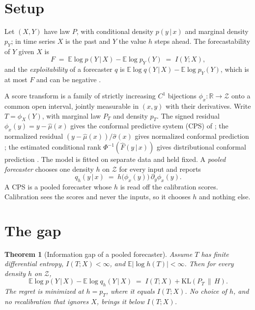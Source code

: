 \documentclass[11pt]{article}
\newtheorem{theorem}{Theorem}
\theoremstyle{definition}
\newcommand{\R}{\mathbb{R}}
\newcommand{\E}{\mathbb{E}}
\newcommand{\KL}{\mathrm{KL}}
\newcommand{\given}{\,\vert\,}
\begin{document}
\section{Setup}\label{sec:setup}

Let $(X,Y)$ have law $P$, with conditional density $p(y\given x)$ and marginal density
$p_Y$; in time series $X$ is the past and $Y$ the value $h$ steps ahead. The forecastability
of $Y$ given $X$ is
\begin{equation}\label{eq:F}
  F \;=\; \E\log p(Y\given X)-\E\log p_Y(Y)\;=\;I(Y;X),
\end{equation}
and the \emph{exploitability} of a forecaster $q$ is $\E\log q(Y\given X)-\E\log p_Y(Y)$,
which is at most $F$ and can be negative \citep{catt2026}.

A score transform is a family of strictly increasing $C^1$ bijections $\phi_x:\R\to\mathcal
Z$ onto a common open interval, jointly measurable in $(x,y)$ with their derivatives. Write
$T=\phi_X(Y)$, with marginal law $P_T$ and density $p_T$. The signed residual
$\phi_x(y)=y-\hat\mu(x)$ gives the conformal predictive system (CPS) of
\citet{vovk2019nonparametric}; the normalized residual $(y-\hat\mu(x))/\hat\sigma(x)$ gives
normalized conformal prediction \citep{lei2018distribution}; the estimated conditional rank
$\Phi^{-1}(\hat F(y\given x))$ gives distributional conformal prediction
\citep{chernozhukov2021distributional}. The model is fitted on separate data and held
fixed. A \emph{pooled forecaster} chooses one density $h$ on $\mathcal Z$ for every input and
reports
\begin{equation}\label{eq:pooled}
  q_h(y\given x)\;=\;h\big(\phi_x(y)\big)\,\partial_y\phi_x(y).
\end{equation}
A CPS is a pooled forecaster whose $h$ is read off the calibration scores. Calibration sees
the scores and never the inputs, so it chooses $h$ and nothing else.

\section{The gap}\label{sec:gap}

\begin{theorem}[Information gap of a pooled forecaster]\label{thm:gap}
Assume $T$ has finite differential entropy, $I(T;X)<\infty$, and $\E|\log h(T)|<\infty$.
Then for every density $h$ on $\mathcal Z$,
\begin{equation}\label{eq:gap}
  \E\log p(Y\given X)-\E\log q_h(Y\given X)\;=\;I(T;X)+\KL(P_T\,\|\,H).
\end{equation}
The regret is minimized at $h=p_T$, where it equals $I(T;X)$. No choice of $h$, and no
recalibration that ignores $X$, brings it below $I(T;X)$.
\end{theorem}
\end{document}
